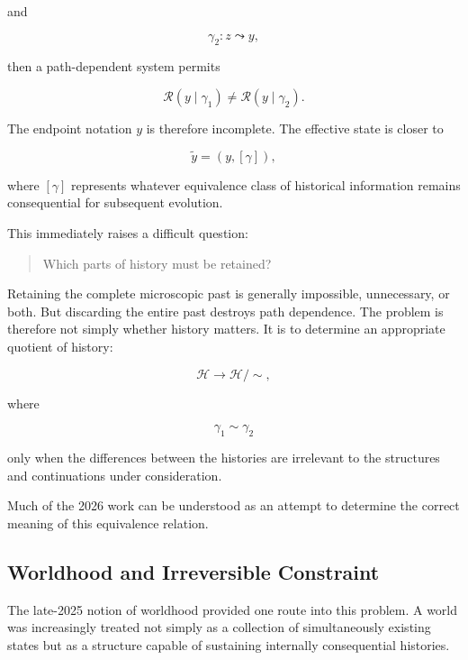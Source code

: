 \documentclass[11pt]{article}
\theoremstyle{remark}
\newcommand{\Reach}{\mathcal{R}}
\newcommand{\Hist}{\mathcal{H}}
\begin{document}
and

\begin{equation}
\gamma_2 : z \leadsto y,
\end{equation}

then a path-dependent system permits

\begin{equation}
\Reach(y\mid\gamma_1)
\neq
\Reach(y\mid\gamma_2).
\end{equation}

The endpoint notation $y$ is therefore incomplete. The effective state is closer to

\begin{equation}
\tilde{y}
=
(y,[\gamma]),
\end{equation}

where $[\gamma]$ represents whatever equivalence class of historical information remains consequential for subsequent evolution.

This immediately raises a difficult question:

\begin{quote}
Which parts of history must be retained?
\end{quote}

Retaining the complete microscopic past is generally impossible, unnecessary, or both. But discarding the entire past destroys path dependence. The problem is therefore not simply whether history matters. It is to determine an appropriate quotient of history:

\begin{equation}
\Hist
\longrightarrow
\Hist/{\sim},
\end{equation}

where

\begin{equation}
\gamma_1 \sim \gamma_2
\end{equation}

only when the differences between the histories are irrelevant to the structures and continuations under consideration.

Much of the 2026 work can be understood as an attempt to determine the correct meaning of this equivalence relation.

\subsection{Worldhood and Irreversible Constraint}

The late-2025 notion of worldhood provided one route into this problem. A world was increasingly treated not simply as a collection of simultaneously existing states but as a structure capable of sustaining internally consequential histories.
\end{document}
